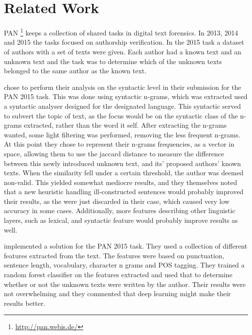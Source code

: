 \section{Related Work}


PAN \footnote{\url{http://pan.webis.de/}} keeps a collection of shared tasks in
digital text forensics. In 2013, 2014 and 2015 the tasks focused on authorship
verification. In the 2015 task a dataset of authors with a set of texts were
given. Each author had a known text and an unknown text and the task was to
determine which of the unknown texts belonged to the same author as the known
text.


\cite{juanpablo2015} chose to perform their analysis on the syntactic level in 
their submission for the PAN 2015 task. This was done using syntactic n-grams,
which was extracted used a syntactic analyser designed for the designated 
language. This syntactic served to subvert the topic of text, as the focus 
would be on the syntactic class of the n-grams extracted, rather than the word 
it self.
After extracting the n-grams wanted, some light filtering was performed, 
removing the less frequent n-grams. At this point they chose to represent their 
n-grams frequencies, as a vector in space, allowing them to use the jaccard 
distance to measure the difference between this newly introduced unknown text, 
and its' proposed authors' known texts. When the similarity fell under a 
certain threshold, the author was deemed non-valid.
This yielded somewhat mediocre results, and they themselves noted that a new 
heuristic handling ill-constructed sentences would probably improved their 
results, as the were just discarded in their case, which caused very low 
accuracy in some cases. Additionally, more features describing other linguistic 
layers, such as lexical, and syntactic feature would probably improve results 
as well.   

\cite{maitra2015} implemented a solution for the PAN 2015 task. They used a
collection of different features extracted from the text. The features were
based on punctuation, sentence length, vocabulary, character n grams and
\gls{POS} tagging. They trained a random forest classifier on the features
extracted and used that to determine whether or not the unknown texts were
written by the author. Their results were not overwhelming and they commented
that deep learning might make their results better.

